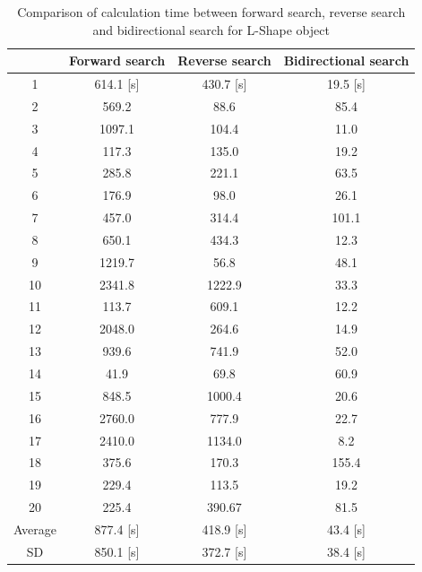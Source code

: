 \documentclass[a4paper,twoside,12pt,papersize, dvipdfmx]{iirthesis}
\begin{document}
\begin{table}[t]
    \centering
    \caption{Comparison of calculation time between forward search, reverse search and bidirectional search for L-Shape object}
    \label{tab::planner::LFB}
    \begin{tabular}{|c|c|c|c|}
    \hline
        ~ & Forward search & Reverse search & Bidirectional search \\ \hline
        1 & 614.1 [s] & 430.7 [s] & 19.5 [s] \\ \hline
        2 & 569.2 & 88.6& 85.4 \\ \hline
        3 & 1097.1 & 104.4 & 11.0 \\ \hline
        4 & 117.3 & 135.0 & 19.2 \\ \hline
        5 & 285.8 & 221.1 & 63.5 \\ \hline
        6 & 176.9 & 98.0 & 26.1 \\ \hline
        7 & 457.0 & 314.4 & 101.1 \\ \hline
        8 & 650.1 & 434.3 & 12.3 \\ \hline
        9 & 1219.7 & 56.8 & 48.1 \\ \hline
        10 & 2341.8 & 1222.9 & 33.3 \\ \hline
        11 & 113.7 & 609.1 & 12.2 \\ \hline
        12 & 2048.0 & 264.6 & 14.9 \\ \hline
        13 & 939.6 & 741.9 & 52.0 \\ \hline
        14 & 41.9 & 69.8 & 60.9 \\ \hline
        15 & 848.5 & 1000.4 & 20.6 \\ \hline
        16 & 2760.0 & 777.9 & 22.7 \\ \hline
        17 & 2410.0 & 1134.0 & 8.2 \\ \hline
        18 & 375.6 & 170.3 & 155.4 \\ \hline
        19 & 229.4 & 113.5 & 19.2 \\ \hline
        20 & 225.4 & 390.67 & 81.5 \\ \hline
        Average & 877.4 [s]  & 418.9 [s] & 43.4 [s] \\ \hline
        SD & 850.1 [s] & 372.7 [s] & 38.4 [s] \\ \hline
    \end{tabular}
\end{table}

\clearpage
\end{document}
